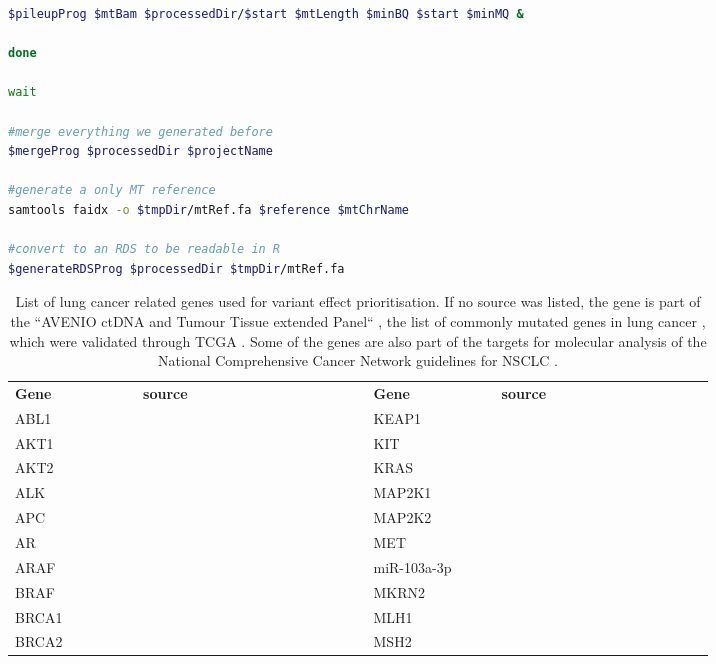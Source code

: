 \begin{lstlisting}[language=bash, caption=Preprocessing of mitochondrial reads and variants for analysis in R, label={lst-cascadeAppendix:mitoPreProcessing}]
    $pileupProg $mtBam $processedDir/$start $mtLength $minBQ $start $minMQ &

done

wait

#merge everything we generated before
$mergeProg $processedDir $projectName

#generate a only MT reference
samtools faidx -o $tmpDir/mtRef.fa $reference $mtChrName

#convert to an RDS to be readable in R
$generateRDSProg $processedDir $tmpDir/mtRef.fa

\end{lstlisting}


\begin{table}
\centering
\caption[Lung cancer genes for CASCADE analysis]{List of lung cancer related genes used for variant effect prioritisation. If no source was listed, the gene is part of the ``AVENIO ctDNA and Tumour Tissue extended Panel`` \protect\cite{RSS2018}, the list of commonly mutated genes in lung cancer \protect\cite{Greulich2010,ElTelbany2012}, which were validated through TCGA \protect\cite{CGARN2014}. Some of the genes are also part of the targets for molecular analysis of the National Comprehensive Cancer Network guidelines for NSCLC \protect\cite{NCCN2022}.}\label{A:cas:tab:lungcancergenes}
\centering
{}
\vspace{-0.5em}
\begin{tabular}{|C{0.15\linewidth} | C{0.25\linewidth} | C{0.02\linewidth} | C{0.15\linewidth} | C{0.25\linewidth}|}
\toprule
 \hhline{|-|-|~|-|-|}
 \textbf{Gene} & \textbf{source} &  & \textbf{Gene} & \textbf{source}\\
 \hhline{|-|-|~|-|-|}
 ABL1 & &  & KEAP1 & \\
 AKT1 & &  & KIT & \\
 AKT2 & &  & KRAS & \\
 ALK & &  & MAP2K1 & \\
 APC & &  & MAP2K2 & \\
 AR & &  & MET & \\
 ARAF & &  & miR-103a-3p & \textcite{Fan2018} \\
 BRAF & &  & MKRN2 & \textcite{Jiang2018c} \\
 BRCA1 & &  & MLH1 & \\
 BRCA2 & &  & MSH2 & \\

\end{tabular}
\end{table}
